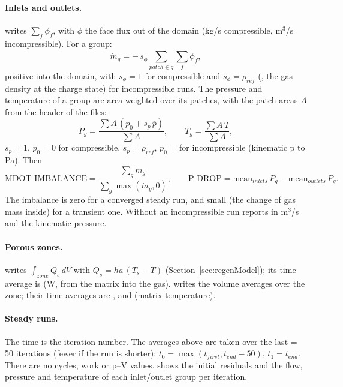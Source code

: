 \paragraph{Inlets and outlets.}
 writes $\sum_f \phi_f$, with $\phi$ the face flux out of the domain (kg/s compressible, m$^3$/s incompressible). For a group:
\begin{equation}
\dot{m}_g = -\, s_\phi \sum_{patch \in g} \overline{\textstyle\sum_f \phi_f} ,
\end{equation}
positive into the domain, with $s_\phi = 1$ for compressible and $s_\phi = \rho_{ref}$ (, the gas density at the charge state) for incompressible runs. The pressure and temperature of a group are area weighted over its patches, with the patch areas $A$ from the header of the  files:
\begin{equation}
P_g = \frac{\sum A\,(p_0 + s_p\,\overline{p})}{\sum A}, \qquad T_g = \frac{\sum A\,\overline{T}}{\sum A} ,
\end{equation}
$s_p = 1$, $p_0 = 0$ for compressible, $s_p = \rho_{ref}$, $p_0$ =  for incompressible (kinematic p to Pa). Then
\begin{equation}
\mathrm{MDOT\_IMBALANCE} = \frac{\sum_g \dot{m}_g}{\sum_g \max(\dot{m}_g, 0)}, \qquad
\mathrm{P\_DROP} = \mathrm{mean}_{inlets}\, P_g - \mathrm{mean}_{outlets}\, P_g .
\end{equation}
The imbalance is zero for a converged steady run, and small (the change of gas mass inside) for a transient one. Without  an incompressible run reports  in m$^3$/s and the kinematic pressure.

\paragraph{Porous zones.}
 writes $\int_{zone} Q_s\,dV$ with $Q_s = h a\,(T_s - T)$ (Section~\ref{sec:regenModel}); its time average is  (W, from the matrix into the gas).  writes the volume averages over the zone; their time averages are ,  and  (matrix temperature).

\paragraph{Steady runs.}
The time is the iteration number. The averages above are taken over the last  = 50 iterations (fewer if the run is shorter): $t_0 = \max(t_{first}, t_{end} - 50)$, $t_1 = t_{end}$. There are no cycles, work or p--V values.  shows the initial residuals and the flow, pressure and temperature of each inlet/outlet group per iteration.

